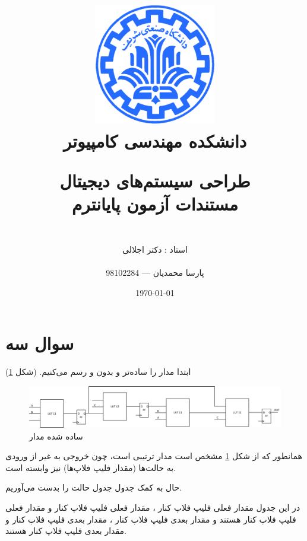 \documentclass[fleqn]{article}
\title{
\includegraphics[width=0.4\textwidth]{sharif.png}\\
\normalsize{دانشکده مهندسی کامپیوتر}\\
\vspace{1cm}
	
\huge{طراحی سیستم‌های دیجیتال}
\\
\Large{مستندات آزمون پایانترم}
\\
}
\author{
\\
استاد : دکتر اجلالی
\\
\\
پارسا محمدیان --- 98102284
}
\date{\today}
\begin{document}
\clearpage\maketitle
\thispagestyle{empty}

\newpage

\pagestyle{fancy}


\tableofcontents

\setcounter{page}{1}

\newpage

\section{سوال سه}
ابتدا مدار را ساده‌تر و بدون
 و 
رسم می‌کنیم. (شکل \ref{3simple})

\begin{figure}[!htbp]
	\centering
	\includegraphics[width=\linewidth]{3simple.png}
	\caption{ساده شده مدار }
	\label{3simple}
\end{figure}

همانطور که از شکل 
\ref{3simple}
مشخص است مدار ترتیبی است، چون خروجی به غیر از ورودی به حالت‌ها (مقدار فلیپ فلاپ‌ها) نیز وابسته است. 

حال به کمک جدول  جدول حالت را بدست می‌آوریم.

در این جدول 
مقدار فعلی فلیپ فلاپ کنار 
،
مقدار فعلی فلیپ فلاپ کنار 
و
مقدار فعلی فلیپ فلاپ کنار 
هستند و 
مقدار بعدی فلیپ فلاپ کنار 
،
مقدار بعدی فلیپ فلاپ کنار 
و
مقدار بعدی فلیپ فلاپ کنار 
هستند.
\end{document}
